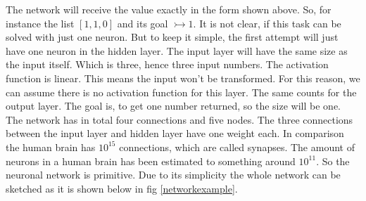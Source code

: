 \documentclass[12pt]{article}
\begin{document}
The network will receive the value exactly in the form shown above. So, for instance the list $ \left[ 1,1,0 \right ] $ and its goal $\rightarrowtail 1 $.  It is not clear, if this task can be solved with just one neuron. But to keep it simple, the first attempt will just have one \gls{neuron} in the \gls{hidden layer}. The \gls{input layer} will have the same size as the input itself. Which is three, hence three input numbers. The activation function is linear. This means the input won't be transformed. For this reason, we can assume there is no \gls{activation function} for this layer. The same counts for the \gls{output layer}. The goal is, to get one number returned, so the size will be one. \\
The network has in total four connections and five nodes. The three connections between the \gls{input layer} and \gls{hidden layer} have one weight each. In comparison the human brain has $10^{15}$ connections, which are called synapses. The amount of neurons in a human brain has been estimated to something around $10^{11}$. So the \gls{neuronal network} is primitive. Due to its simplicity the whole network can be sketched as it is shown below in fig \ref{networkexample}. 
\\
\end{document}
